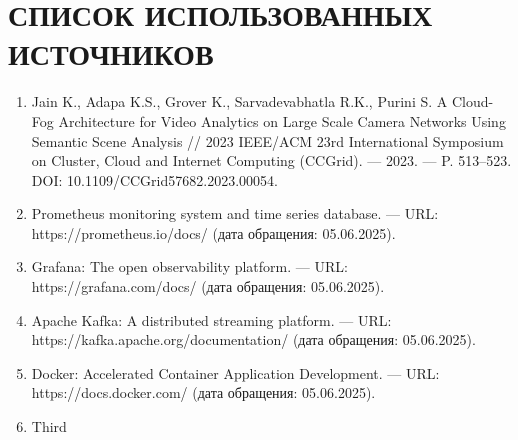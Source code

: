 \chapter*{СПИСОК ИСПОЛЬЗОВАННЫХ ИСТОЧНИКОВ}


\begin{enumerate}[label=\arabic*)\hspace{1em}, leftmargin=1cm, itemsep=0em]
	\item Jain K., Adapa K.S., Grover K., Sarvadevabhatla R.K., Purini S. A Cloud-Fog Architecture for Video Analytics on Large Scale Camera Networks Using Semantic Scene Analysis // 2023 IEEE/ACM 23rd International Symposium on Cluster, Cloud and Internet Computing (CCGrid). — 2023. — P. 513–523. DOI: 10.1109/CCGrid57682.2023.00054.
	\item Prometheus monitoring system and time series database. — URL: https://prometheus.io/docs/ (дата обращения: 05.06.2025).
	\item Grafana: The open observability platform. — URL: https://grafana.com/docs/ (дата обращения: 05.06.2025).
	\item Apache Kafka: A distributed streaming platform. — URL: https://kafka.apache.org/documentation/ (дата обращения: 05.06.2025).
	\item Docker: Accelerated Container Application Development. — URL: https://docs.docker.com/ (дата обращения: 05.06.2025).
	\item Third
\end{enumerate}